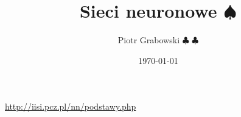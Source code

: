 \documentclass[a4paper,10pt]{article}
\title{Sieci neuronowe $\spadesuit$}
\author{Piotr Grabowski $\clubsuit$ $\clubsuit$}
\date{\today}
\begin{document}
\maketitle

\url{http://iisi.pcz.pl/nn/podstawy.php} 

\tableofcontents









\end{document}
